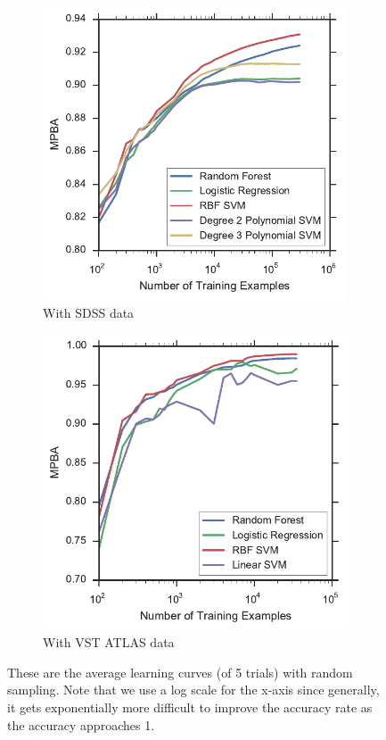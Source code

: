 \begin{figure}[tbp]
	\centering
	\begin{subfigure}{.5\textwidth}
		\centering
		\includegraphics[width=0.99\textwidth]{figures/4_expt1/sdss_learning_curves}
		\caption{With SDSS data}
		\label{fig:sdss_learning_curves}
	\end{subfigure}%
	\begin{subfigure}{.5\textwidth}
		\centering
		\includegraphics[width=0.99\linewidth]{figures/4_expt1/vstatlas_learning_curves}
		\caption{With VST ATLAS data}
		\label{fig:vstatlas_learning_curves}
	\end{subfigure}
	\caption[Learning curves with random sampling]{
		These are the average learning curves (of 5 trials) with random sampling.
		Note that we use a log scale for the x-axis since generally, it gets exponentially
		more difficult to improve the accuracy rate as the accuracy approaches 1.}
	\label{fig:learning_curves}
\end{figure}
